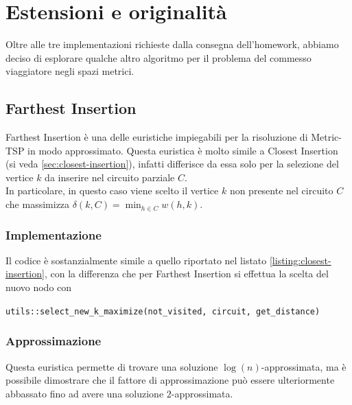 \section{Estensioni e originalità}
\label{cap:extensions-and-originalities}

\noindent Oltre alle tre implementazioni richieste dalla consegna
dell'homework, abbiamo deciso di esplorare qualche altro algoritmo per il problema del commesso viaggiatore negli spazi metrici.\\

\subsection{Farthest Insertion}
\label{sec:farthest-insertion}

\noindent Farthest Insertion è una delle euristiche impiegabili per la
risoluzione di Metric-TSP in modo approssimato. Questa euristica è
molto simile a Closest Insertion (si veda
\ref{sec:closest-insertion}), infatti differisce da essa solo per la
selezione del vertice $k$ da inserire nel circuito parziale $C$.\\

\noindent In particolare, in questo caso viene scelto il vertice $k$
non presente nel circuito $C$ che massimizza $\delta (k, C) = \min_{h
  \in C} w(h, k)$.\\

\subsubsection{Implementazione}

\noindent Il codice è sostanzialmente simile a quello riportato nel
listato \ref{listing:closest-insertion}, con la differenza che per
Farthest Insertion si effettua la scelta del nuovo nodo con

\begin{center}
\texttt{utils::select_new_k_maximize(not_visited, circuit, get_distance)}
\end{center}

\subsubsection{Approssimazione}

\noindent Questa euristica permette di trovare una soluzione
$\log(n)$-approssimata, ma è possibile dimostrare che il fattore di
approssimazione può essere ulteriormente abbassato fino ad avere una
soluzione $2$-approssimata.\\

